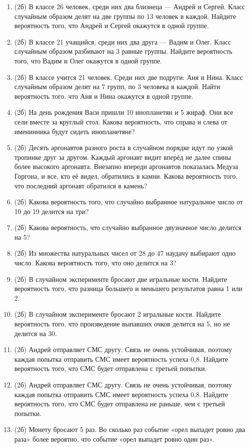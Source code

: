 \documentclass[a4paper, 12pt]{article}
\begin{document}
\begin{enumerate}
\item (2б) В классе 26 человек, среди них два близнеца — Андрей и Сергей. Класс случайным образом делят на две группы по 13 человек в каждой. 
Найдите вероятность того, что Андрей и Сергей окажутся в одной группе. 
\item (2б) В классе 21 учащийся, среди них два друга — Вадим и Олег. Класс случайным образом разбивают на 3 равные группы. Найдите вероятность того, 
что Вадим и Олег окажутся в одной группе. 
\item (2б) В классе учится 21 человек. Среди них две подруги: Аня и Нина. Класс случайным образом делят на 7 групп, по 3 человека в каждой. 
Найти вероятность того. что Аня и Нина окажутся в одной группе. 
\item (2б) На день рождения Васи пришли 10 инопланетян и 5 жираф. Они все сели вместе за круглый стол. 
Какова вероятность, что справа и слева от именинника будут сидеть инопланетяне? 
\item (2б) Десять аргонавтов разного роста в случайном порядке идут по узкой тропинке друг за другом. 
Каждый аргонавт видит вперёд не далее спины более высокого аргонавта. 
Внезапно впереди аргонавтов показалась Медуза Горгона, и все, кто её видел, обратились в камни. 
Какова вероятность того, что последний аргонавт обратился в камень? 
\item (2б) Какова вероятность того, что случайно выбранное натуральное число от 10 до 19 делится на три? 
\item (2б) Какова вероятность, что случайно выбранное двузначное число делится на 5? 
\item (2б) Из множества натуральных чисел от 28 до 47 наудачу выбирают одно число. Какова вероятность того, что оно делится на 3? 
\item (2б) В случайном эксперименте бросают две игральные кости. Найдите вероятность того, что разница большего и меньшего результатов равна 1 или 2. 
\item (2б) В случайном эксперименте бросают 2 игральные кости. Найдите вероятность того, что произведение выпавших очков делится на 5, 
но не делится на 30. 
\item (2б) Андрей отправляет СМС другу. Связь не очень устойчивая, поэтому каждая попытка отправить СМС имеет вероятность успеха 0,8. 
Найдите вероятность того, что СМС будет отправлена с третьей попытки. 
\item (2б) Андрей отправляет СМС другу. Связь не очень устойчивая, поэтому каждая попытка отправить СМС имеет вероятность успеха 0,8. 
Найдите вероятность того, что СМС будет отправлена не раньше, чем с третьей попытки. 
\item (2б) Монету бросают 5 раз. Во сколько раз событие «орел выпадет ровно два раза» более вероятно, что событие «орел выпадет ровно один раз». 


\end{enumerate}
\end{document}
